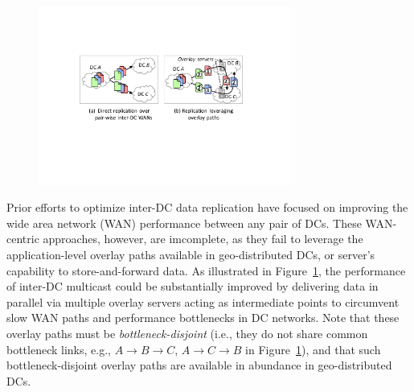 \begin{figure}[t!]
\includegraphics[width=83mm]{images/intro-example-3.pdf}
\vspace{-0.4cm}
\label{fig:intro}
\vspace{-0.4cm}
\end{figure}

Prior efforts to optimize inter-DC data replication have focused on improving the wide area network (WAN) performance between any pair of DCs. These WAN-centric approaches, however, are imcomplete, as they fail to leverage the application-level overlay paths available in
geo-distributed DCs, or server's capability to
store-and-forward data.
As illustrated in Figure~\ref{fig:intro}, the performance of
inter-DC multicast could be substantially improved by
delivering data in parallel via multiple overlay servers
acting as intermediate points to circumvent slow WAN paths and
performance bottlenecks in DC networks.
Note that these overlay paths must be {\em bottleneck-disjoint} (i.e., they do
not share common bottleneck links, e.g., $A$$\rightarrow$$B$$\rightarrow$$C$,
$A$$\rightarrow$$C$$\rightarrow$$B$ in Figure~\ref{fig:intro}), and that
such bottleneck-disjoint overlay paths are available in abundance in
geo-distributed DCs.




